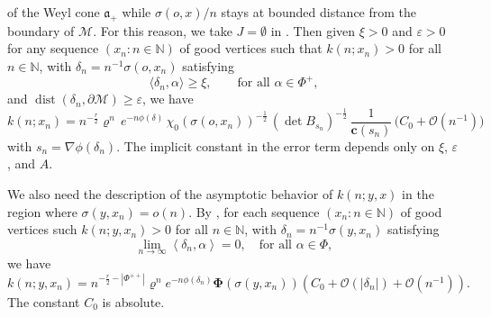 \documentclass[11pt]{amsart}
\newcommand{\NN}{\mathbb{N}}
\newcommand{\calO}{\mathcal{O}}
\newcommand{\calM}{\mathcal{M}}
\newcommand{\bfc}{\mathbf{c}}
\newcommand{\sprod}[2]{\langle {#1}, {#2} \rangle}
\newcommand{\dist}{\operatorname{dist}}
\theoremstyle{plain}
\theoremstyle{definition}
\numberwithin{equation}{section}
\begin{document}
of the Weyl cone $\mathfrak{a}_+$ while $\sigma(o, x)/n$ stays at bounded distance from the boundary of $\calM$. For this 
reason, we take $J = \emptyset$ in \cite[Theorem 4.1]{tr}. Then given $\xi > 0$ and $\varepsilon > 0$ for any sequence 
$(x_n : n \in \NN)$ of good vertices such that $k(n; x_n) > 0$ for all $n \in \NN$, with $\delta_n = n^{-1} \sigma(o, x_n)$ 
satisfying
\[
	\sprod{\delta_n}{\alpha} \geqslant \xi, \qquad \text{for all } \alpha \in \Phi^+,
\]
and $\dist(\delta_n, \partial \calM) \geqslant \varepsilon$, we have
\begin{equation}
	\label{eq:3a}
	k(n;x_n)
	=
	n^{-\frac{r}{2}} \varrho^n \,e^{-n\phi(\delta)}\, 
	\chi_0(\sigma(o,x_n))^{-\frac{1}{2}}\,( \det B_{s_n})^{-\frac{1}{2}} \, \frac{1}{\bfc(s_n)}\, 
	\Big(C_0 + \calO(n^{-1})\Big)
\end{equation}
with $s_n = \nabla \phi(\delta_n)$. The implicit constant in the error term depends only on $\xi$, $\varepsilon$, and $A$.

We also need the description of the asymptotic behavior of $k(n; y, x)$ in the region where $\sigma(y, x_n) = o(n)$.
By \cite[Corollary 4.10]{tr}, for each sequence $(x_n: n \in \NN)$ of good vertices such $k(n; y, x_n) > 0$ for all $n \in \NN$,
with $\delta_n = n^{-1} \sigma(y, x_n)$ satisfying
\[
	\lim _{n \rightarrow \infty} \left\langle \delta_n, \alpha\right\rangle=0, \quad \text {for all } \alpha \in \Phi,
\]
we have
\begin{equation}
	\label{eq:3b}
	k(n; y, x_n) =
	n^{-\frac{r}{2}-\left|\Phi^{++}\right|} \varrho^n e^{-n \phi\left(\delta_n\right)} 
	\mathbf{\Phi}(\sigma(y, x_n))
	\left(C_0+\mathcal{O}(\left|\delta_n\right|)+\mathcal{O}(n^{-1})\right).
\end{equation}
The constant $C_0$ is absolute.
	
\end{document}
